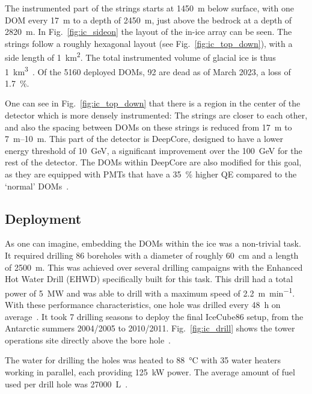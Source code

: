 The instrumented part of the strings starts at \SI{1450}{\m} below surface, with one DOM every \SI{17}{\m} to a depth of \SI{2450}{\m}, just above the bedrock at a depth of \SI{2820}{\m}. In Fig.~\ref{fig:ic_sideon} the layout of the in-ice array can be seen. The strings follow a roughly hexagonal layout (see Fig.~\ref{fig:ic_top_down}), with a side length of \SI{1}{\km\squared}. The total instrumented volume of glacial ice is thus \SI{1}{\km\cubed}~\cite{Aartsen2017}. Of the 5160 deployed DOMs, 92 are dead as of March 2023, a loss of \SI{1.7}{\percent}.

One can see in Fig.~\ref{fig:ic_top_down} that there is a region in the center of the detector which is more densely instrumented: The strings are closer to each other, and also the spacing between DOMs on these strings is reduced from \SI{17}{\m} to \SIrange{7}{10}{\m}. This part of the detector is DeepCore, designed to have a lower energy threshold of \SI{10}{\GeV}, a significant improvement over the \SI{100}{\GeV} for the rest of the detector. The DOMs within DeepCore are also modified for this goal, as they are equipped with PMTs that have a \SI{35}{\percent} higher QE compared to the `normal' DOMs~\cite{Aartsen2017}.


\subsection{Deployment}
As one can imagine, embedding the DOMs within the ice was a non-trivial task. It required drilling 86 boreholes with a diameter of roughly \SI{60}{\cm} and a length of \SI{2500}{\m}. This was achieved over several drilling campaigns with the Enhanced Hot Water Drill (EHWD) specifically built for this task. This drill had a total power of \SI{5}{\mega\W} and was able to drill with a maximum speed of \SI{2.2}{\meter\per\minute}. With these performance characteristics, one hole was drilled every \SI{48}{\hour} on average~\cite{Aartsen2017}. It took 7 drilling seasons to deploy the final IceCube86 setup, from the Antarctic summers 2004/2005 to 2010/2011. Fig.~\ref{fig:ic_drill} shows the tower operations site directly above the bore hole~.

The water for drilling the holes was heated to \SI{88}{\celsius} with 35 water heaters working in parallel, each providing \SI{125}{\kilo\W} power. The average amount of fuel used per drill hole was \SI{27000}{\liter}~\cite{Benson2014}.

